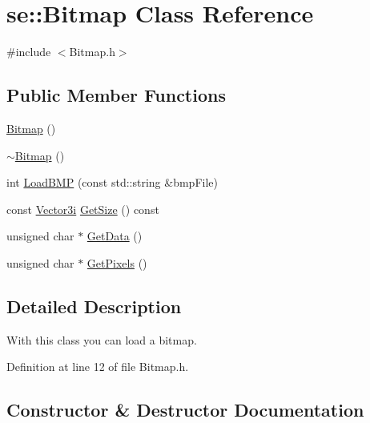 \hypertarget{classse_1_1_bitmap}{}\section{se\+:\+:Bitmap Class Reference}
\label{classse_1_1_bitmap}


{\ttfamily \#include $<$Bitmap.\+h$>$}

\subsection*{Public Member Functions}
\begin{DoxyCompactItemize}
\item 
\mbox{\hyperlink{classse_1_1_bitmap_a7b43662ae9e5584ee8e3cef244ca32f7}{Bitmap}} ()
\item 
\mbox{\hyperlink{classse_1_1_bitmap_aa098fcae7998e75240e46594fe84996e}{$\sim$\+Bitmap}} ()
\item 
int \mbox{\hyperlink{classse_1_1_bitmap_a76c7fbaf5d2049af44abf83fe40a854d}{Load\+B\+MP}} (const std\+::string \&bmp\+File)
\item 
const \mbox{\hyperlink{namespacese_ada11715de7cf6e87b5dfb4611fe68d29}{Vector3i}} \mbox{\hyperlink{classse_1_1_bitmap_a805adca2ccb528c6e694db84a51c7b66}{Get\+Size}} () const
\item 
unsigned char $\ast$ \mbox{\hyperlink{classse_1_1_bitmap_a2467e494eccacc94756c3f02b0d0cc5e}{Get\+Data}} ()
\item 
unsigned char $\ast$ \mbox{\hyperlink{classse_1_1_bitmap_a7e0aa0d86804f241261c46307447a4f5}{Get\+Pixels}} ()
\end{DoxyCompactItemize}


\subsection{Detailed Description}
With this class you can load a bitmap. 

Definition at line 12 of file Bitmap.\+h.



\subsection{Constructor \& Destructor Documentation}
\mbox{\label{classse_1_1_bitmap_a7b43662ae9e5584ee8e3cef244ca32f7}} 
